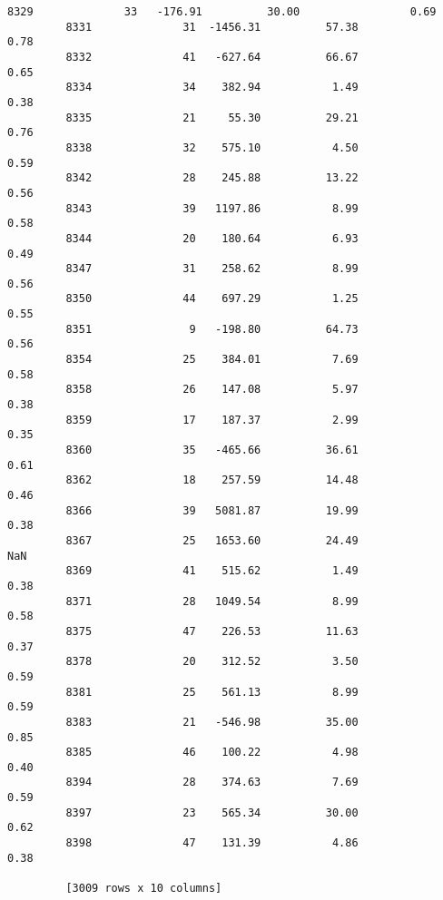 \documentclass[11pt]{article}
\begin{document}
\begin{Verbatim}[commandchars=\\\{\}]
         8329              33   -176.91          30.00                 0.69  
         8331              31  -1456.31          57.38                 0.78  
         8332              41   -627.64          66.67                 0.65  
         8334              34    382.94           1.49                 0.38  
         8335              21     55.30          29.21                 0.76  
         8338              32    575.10           4.50                 0.59  
         8342              28    245.88          13.22                 0.56  
         8343              39   1197.86           8.99                 0.58  
         8344              20    180.64           6.93                 0.49  
         8347              31    258.62           8.99                 0.56  
         8350              44    697.29           1.25                 0.55  
         8351               9   -198.80          64.73                 0.56  
         8354              25    384.01           7.69                 0.58  
         8358              26    147.08           5.97                 0.38  
         8359              17    187.37           2.99                 0.35  
         8360              35   -465.66          36.61                 0.61  
         8362              18    257.59          14.48                 0.46  
         8366              39   5081.87          19.99                 0.38  
         8367              25   1653.60          24.49                  NaN  
         8369              41    515.62           1.49                 0.38  
         8371              28   1049.54           8.99                 0.58  
         8375              47    226.53          11.63                 0.37  
         8378              20    312.52           3.50                 0.59  
         8381              25    561.13           8.99                 0.59  
         8383              21   -546.98          35.00                 0.85  
         8385              46    100.22           4.98                 0.40  
         8394              28    374.63           7.69                 0.59  
         8397              23    565.34          30.00                 0.62  
         8398              47    131.39           4.86                 0.38  
         
         [3009 rows x 10 columns]
\end{Verbatim}
            
\end{document}
